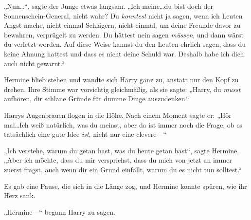 „Nun…“, sagte der Junge etwas langsam. „Ich meine…du bist doch der Sonnenschein-General, nicht wahr? Du \emph{konntest} nicht ja sagen, wenn ich Leuten Angst mache, nicht einmal Schlägern, nicht einmal, um deine Freunde davor zu bewahren, verprügelt zu werden. Du hättest nein sagen \emph{müssen}, und dann wärst du verletzt worden. Auf diese Weise kannst du den Leuten ehrlich sagen, dass du keine Ahnung hattest und dass es nicht deine Schuld war. Deshalb habe ich dich auch nicht gewarnt.“

Hermine blieb stehen und wandte sich Harry ganz zu, anstatt nur den Kopf zu drehen. Ihre Stimme war vorsichtig gleichmäßig, als sie sagte: „Harry, du \emph{musst} aufhören, dir schlaue Gründe für dumme Dinge auszudenken.“

Harrys Augenbrauen flogen in die Höhe. Nach einem Moment sagte er: „Hör mal…Ich weiß natürlich, was du meinst, aber da ist immer noch die Frage, ob es tatsächlich eine gute Idee \emph{ist}, nicht nur eine clevere—“

„Ich verstehe, warum du getan hast, was du heute getan hast“, sagte Hermine. „Aber ich möchte, dass du mir versprichst, dass du mich von jetzt an immer zuerst fragst, auch wenn dir ein Grund einfällt, warum du es nicht tun solltest.“

Es gab eine Pause, die sich in die Länge zog, und Hermine konnte spüren, wie ihr Herz sank.

„Hermine—“ begann Harry zu sagen.

